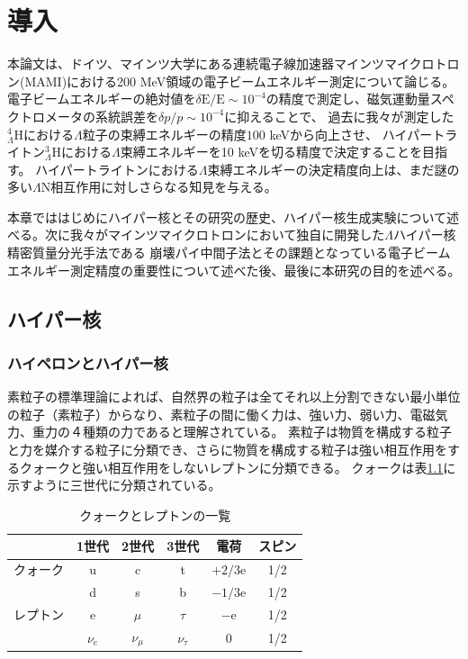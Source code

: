 \documentclass[a4paper,11pt,uplatex]{jsbook}
\begin{document}
\chapter{導入}
本論文は、ドイツ、マインツ大学にある連続電子線加速器マインツマイクロトロン(MAMI)における200 MeV領域の電子ビームエネルギー測定について論じる。
電子ビームエネルギーの絶対値を$\delta \text{E}/\text{E} \sim 10^{-4}$の精度で測定し、磁気運動量スペクトロメータの系統誤差を$\delta p/p \sim 10^{-4}$に抑えることで、
過去に我々が測定した$^4_{\Lambda} \text{H}$における$\Lambda$粒子の束縛エネルギーの精度$100$ keVから向上させ、
ハイパートライトン$^3_{\Lambda}\text{H}$における$\Lambda$束縛エネルギーを10 keVを切る精度で決定することを目指す。
ハイパートライトンにおける$\Lambda$束縛エネルギーの決定精度向上は、まだ謎の多い$\Lambda$N相互作用に対しさらなる知見を与える。

本章でははじめにハイパー核とその研究の歴史、ハイパー核生成実験について述べる。次に我々がマインツマイクロトロンにおいて独自に開発した$\Lambda$ハイパー核精密質量分光手法である
崩壊パイ中間子法とその課題となっている電子ビームエネルギー測定精度の重要性について述べた後、最後に本研究の目的を述べる。
\section{ハイパー核}

\subsection{ハイペロンとハイパー核}
素粒子の標準理論によれば、自然界の粒子は全てそれ以上分割できない最小単位の粒子（素粒子）からなり、素粒子の間に働く力は、強い力、弱い力、電磁気力、重力の４種類の力であると理解されている。
素粒子は物質を構成する粒子と力を媒介する粒子に分類でき、さらに物質を構成する粒子は強い相互作用をするクォークと強い相互作用をしないレプトンに分類できる。
クォークは表\ref{tab:quark}に示すように三世代に分類されている。
\begin{table}[ht]
\centering
\begin{tabular}{|c||c|c|c||c|c|}
  \hline
  & 1世代 & 2世代 & 3世代 & 電荷 & スピン\\
  \hline\hline
  クォーク & u & c & t & $+2/3$e & 1/2\\
  & d & s & b & $-1/3$e & 1/2\\ \hline
  レプトン & e& $\mu$& $\tau$& $-$e& 1/2\\
  &$\nu_e$ & $\nu_\mu$& $\nu_\tau$& 0 & 1/2\\
  \hline
\end{tabular}\label{tab:quark}
\caption{クォークとレプトンの一覧}
\end{table}
\end{document}
